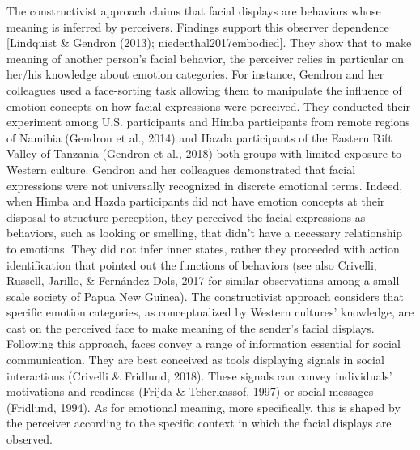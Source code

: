 \documentclass[
  english,
  doc]{apa7}
\begin{document}
The constructivist approach claims that facial displays are behaviors whose meaning is inferred by perceivers. Findings support this observer dependence {[}Lindquist \& Gendron (2013); niedenthal2017embodied{]}. They show that to make meaning of another person's facial behavior, the perceiver relies in particular on her/his knowledge about emotion categories. For instance, Gendron and her colleagues used a face-sorting task allowing them to manipulate the influence of emotion concepts on how facial expressions were perceived. They conducted their experiment among U.S. participants and Himba participants from remote regions of Namibia (Gendron et al., 2014) and Hazda participants of the Eastern Rift Valley of Tanzania (Gendron et al., 2018) both groups with limited exposure to Western culture. Gendron and her colleagues demonstrated that facial expressions were not universally recognized in discrete emotional terms. Indeed, when Himba and Hazda participants did not have emotion concepts at their disposal to structure perception, they perceived the facial expressions as behaviors, such as looking or smelling, that didn't have a necessary relationship to emotions. They did not infer inner states, rather they proceeded with action identification that pointed out the functions of behaviors (see also Crivelli, Russell, Jarillo, \& Fernández-Dols, 2017 for similar observations among a small-scale society of Papua New Guinea). The constructivist approach considers that specific emotion categories, as conceptualized by Western cultures' knowledge, are cast on the perceived face to make meaning of the sender's facial displays. Following this approach, faces convey a range of information essential for social communication. They are best conceived as tools displaying signals in social interactions (Crivelli \& Fridlund, 2018). These signals can convey individuals' motivations and readiness (Frijda \& Tcherkassof, 1997) or social messages (Fridlund, 1994). As for emotional meaning, more specifically, this is shaped by the perceiver according to the specific context in which the facial displays are observed.
\end{document}
